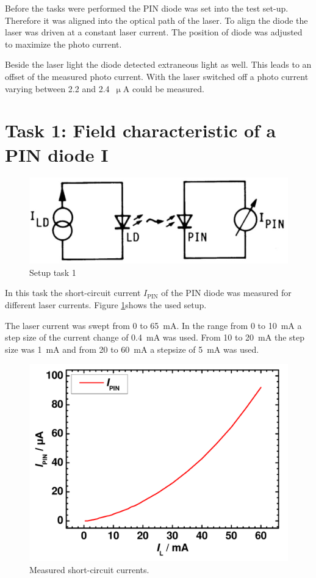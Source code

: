 Before the tasks were performed the PIN diode was set into the test set-up. Therefore it was aligned into the optical path of the laser. To align the diode the laser was driven at a constant laser current. The position of diode was adjusted to maximize the photo current. 


Beside the laser light the diode detected extraneous light as well. This leads to an offset of the measured photo current. With the laser switched off a photo current varying between 2.2 and 2.4~$\upmu$A could be measured.

\section{Task 1: Field characteristic of a PIN diode I}

\begin{figure}%
\centering
\includegraphics[width=.5\columnwidth]{Grafiken/T1_setup.jpg}%
\caption{Setup task 1}%
\label{fig:T1_setup}%
\end{figure}
In this task the short-circuit current $I_{\mathrm{PIN}}$ of the PIN diode was measured for different laser currents. Figure \ref{fig:T1_setup}\footnotemark[1] shows the used setup. 

The laser current was swept from 0 to 65~mA. In the range from 0 to 10~mA a step size of the current change of 0.4~mA was used. From 10 to 20~mA the step size was 1~mA and from 20 to 60~mA a stepsize of 5~mA was used.

\begin{figure}%
\centering
\includegraphics[width=.5\columnwidth]{Grafiken/T1_laser.pdf}%
\caption{Measured short-circuit currents.}%
\label{fig:T1_laser}%
\end{figure}

